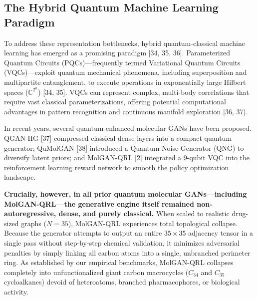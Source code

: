 \documentclass[10pt,a4paper]{article}
\begin{document}
\subsection{The Hybrid Quantum Machine Learning Paradigm}
To address these representation bottlenecks, hybrid quantum-classical machine learning has emerged as a promising paradigm [34, 35, 36]. Parameterized Quantum Circuits (PQCs)---frequently termed Variational Quantum Circuits (VQCs)---exploit quantum mechanical phenomena, including superposition and multipartite entanglement, to execute operations in exponentially large Hilbert spaces ($\mathbb{C}^{2^n}$) [34, 35]. VQCs can represent complex, multi-body correlations that require vast classical parameterizations, offering potential computational advantages in pattern recognition and continuous manifold exploration [36, 37].

In recent years, several quantum-enhanced molecular GANs have been proposed. QGAN-HG [37] compressed classical dense layers into a compact quantum generator; QuMolGAN [38] introduced a Quantum Noise Generator (QNG) to diversify latent priors; and MolGAN-QRL [2] integrated a 9-qubit VQC into the reinforcement learning reward network to smooth the policy optimization landscape.

\textbf{Crucially, however, in all prior quantum molecular GANs---including MolGAN-QRL---the generative engine itself remained non-autoregressive, dense, and purely classical.} When scaled to realistic drug-sized graphs ($N = 35$), MolGAN-QRL experiences total topological collapse. Because the generator attempts to output an entire $35 \times 35$ adjacency tensor in a single pass without step-by-step chemical validation, it minimizes adversarial penalties by simply linking all carbon atoms into a single, unbranched perimeter ring. As established by our empirical benchmarks, MolGAN-QRL collapses completely into unfunctionalized giant carbon macrocycles ($C_{34}$ and $C_{35}$ cycloalkanes) devoid of heteroatoms, branched pharmacophores, or biological activity.
\end{document}
